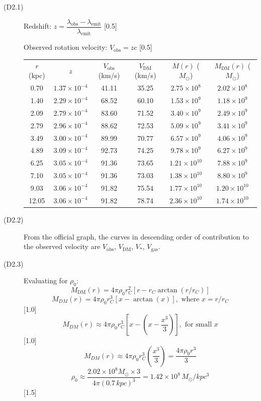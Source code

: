 \begin{description}
\item[(D2.1)] Redshift:
  $z = \dfrac{\lambda_{\mathrm{obs}} - \lambda_{\mathrm{emit}}}
             {\lambda_{\mathrm{emit}}}$ \hfill[0.5]

  Observed rotation velocity: $V_{\mathrm{obs}} = zc$ \hfill[0.5]

  \begin{center}
  \begin{tabular}{cccccc}
  $r$ (kpc) & $z$ & $V_{\mathrm{obs}}$ (km/s) & $V_{\mathrm{DM}}$ (km/s)
    & $M(r)$ ($M_\odot$) & $M_{\mathrm{DM}}(r)$ ($M_\odot$)\\
  0.70 & $1.37\times 10^{-4}$ & 41.11 & 35.25
    & $2.75\times 10^{8}$ & $2.02\times 10^{8}$\\
  1.40 & $2.29\times 10^{-4}$ & 68.52 & 60.10
    & $1.53\times 10^{9}$ & $1.18\times 10^{9}$\\
  2.09 & $2.79\times 10^{-4}$ & 83.60 & 71.52
    & $3.40\times 10^{9}$ & $2.49\times 10^{9}$\\
  2.79 & $2.96\times 10^{-4}$ & 88.62 & 72.53
    & $5.09\times 10^{9}$ & $3.41\times 10^{9}$\\
  3.49 & $3.00\times 10^{-4}$ & 89.99 & 70.77
    & $6.57\times 10^{9}$ & $4.06\times 10^{9}$\\
  4.89 & $3.09\times 10^{-4}$ & 92.73 & 74.25
    & $9.78\times 10^{9}$ & $6.27\times 10^{9}$\\
  6.25 & $3.05\times 10^{-4}$ & 91.36 & 73.65
    & $1.21\times 10^{10}$ & $7.88\times 10^{9}$\\
  7.10 & $3.05\times 10^{-4}$ & 91.36 & 73.03
    & $1.38\times 10^{10}$ & $8.80\times 10^{9}$\\
  9.03 & $3.06\times 10^{-4}$ & 91.82 & 75.54
    & $1.77\times 10^{10}$ & $1.20\times 10^{10}$\\
  12.05 & $3.06\times 10^{-4}$ & 91.82 & 78.74
    & $2.36\times 10^{10}$ & $1.74\times 10^{10}$
  \end{tabular}
  \end{center}

\item[(D2.2)]
  From the official graph, the curves in descending order of contribution
  to the observed velocity are $V_{\mathrm{obs}}$, $V_{\mathrm{DM}}$,
  $V_{*}$, $V_{\mathrm{gas}}$.

\item[(D2.3)] Evaluating for $\rho_0$:
  \[ M_{\mathrm{DM}}(r) = 4\pi\rho_0 r_C^2
     \left[r - r_C\arctan(r/r_C)\right] \]
  \[ M_{DM}(r) = 4\pi\rho_0 r_C^3\left[x - \arctan(x)\right],
     \text{ where } x = r/r_C \]
  \hfill[1.0]
  \[ M_{DM}(r) \approx 4\pi\rho_0 r_C^3
     \left[x - \left(x - \frac{x^3}{3}\right)\right],
     \text{ for small } x \]
  \hfill[1.0]
  \[ M_{DM}(r) \approx 4\pi\rho_0 r_C^3\left(\frac{x^3}{3}\right)
     = \frac{4\pi\rho_0 r^3}{3} \]
  \[ \rho_0 \approx \frac{2.02\times 10^{8}M_\odot\times 3}
     {4\pi(0.7\,kpc)^3} = 1.42\times 10^{8}\,M_\odot/kpc^3 \]
  \hfill[1.5]


\end{description}
